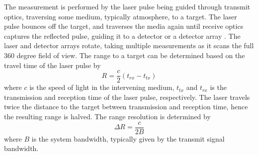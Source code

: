 The measurement is performed by the laser pulse being guided through transmit optics, traversing some medium, typically atmosphere, to a target. The laser pulse bounces off the target, and traverses the media again until receive optics captures the reflected pulse, guiding it to a detector or a detector array \cite{SpieLidar}. The laser and detector arrays rotate, taking multiple measurements as it scans the full 360 degree field of view. The range to a target can be determined based on the travel time of the laser pulse by
\begin{equation}
R=\frac{c}{2}(t_{rx}-t_{tx})
\end{equation}
where $c$ is the speed of light in the intervening medium, $t_{tx}$ and $t_{rx}$ is the transmission and reception time of the laser pulse, respectively. The laser travels twice the distance to the target between transmission and reception time, hence the resulting range is halved. The range resolution is determined by 
\begin{equation}
\Delta R=\frac{c}{2B}
\end{equation}
where $B$ is the system bandwidth, typically given by the transmit signal bandwidth.

